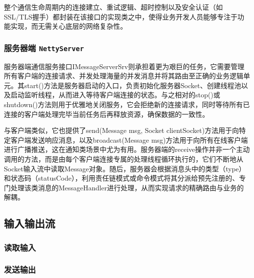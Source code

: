 整个通信生命周期内的连接建立、重试逻辑、超时控制以及安全认证（如SSL/TLS握手）都封装在该接口的实现类之中，使得业务开发人员能够专注于功能实现，而无需关心底层的网络复杂性。
\subsubsection{服务器端 \texttt{NettyServer}}
服务器端通信服务接口IMessageServerSrv则承担着更为艰巨的任务，它需要管理所有客户端的连接请求、并发处理海量的并发消息并将其路由至正确的业务逻辑单元。其start()方法是服务器启动的入口，负责初始化服务器Socket、创建线程池以及启动监听线程，从而进入等待客户端连接的状态。与之相对的stop()或shutdown()方法则用于优雅地关闭服务，它会拒绝新的连接请求，同时等待所有已连接的客户端处理完毕当前任务后再释放资源，确保数据的一致性。

与客户端类似，它也提供了send(Message msg, Socket clientSocket)方法用于向特定客户端发送响应消息，以及broadcast(Message msg)方法用于向所有在线客户端进行广播推送，这在通知类场景中尤为有用。服务器端的receive操作并非一个主动调用的方法，而是由每个客户端连接专属的处理线程循环执行的，它们不断地从Socket输入流中读取Message对象。随后，服务器会根据消息头中的类型（type）和状态码（statusCode），利用责任链模式或命令模式将其分派给预先注册的、专门处理该类消息的MessageHandler进行处理，从而实现请求的精确路由与业务的解耦。
\subsection{输入输出流}
\subsubsection{读取输入}
\subsubsection{发送输出}
